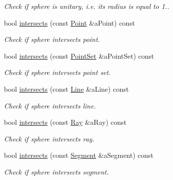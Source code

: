 \begin{DoxyCompactItemize}
\begin{DoxyCompactList}\small\item\em Check if sphere is unitary, i.\+e. its radius is equal to 1.. \end{DoxyCompactList}\item 
bool \hyperlink{classlibrary_1_1math_1_1geom_1_1d3_1_1objects_1_1_sphere_a4fba612ae266e54b1ce301831aef5219}{intersects} (const \hyperlink{classlibrary_1_1math_1_1geom_1_1d3_1_1objects_1_1_point}{Point} \&a\+Point) const
\begin{DoxyCompactList}\small\item\em Check if sphere intersects point. \end{DoxyCompactList}\item 
bool \hyperlink{classlibrary_1_1math_1_1geom_1_1d3_1_1objects_1_1_sphere_a3b92bc83fc458553437b7e2a50849859}{intersects} (const \hyperlink{classlibrary_1_1math_1_1geom_1_1d3_1_1objects_1_1_point_set}{Point\+Set} \&a\+Point\+Set) const
\begin{DoxyCompactList}\small\item\em Check if sphere intersects point set. \end{DoxyCompactList}\item 
bool \hyperlink{classlibrary_1_1math_1_1geom_1_1d3_1_1objects_1_1_sphere_a3740a954ea02ce23ff121a92f8902d92}{intersects} (const \hyperlink{classlibrary_1_1math_1_1geom_1_1d3_1_1objects_1_1_line}{Line} \&a\+Line) const
\begin{DoxyCompactList}\small\item\em Check if sphere intersects line. \end{DoxyCompactList}\item 
bool \hyperlink{classlibrary_1_1math_1_1geom_1_1d3_1_1objects_1_1_sphere_a726c504380238289eb3a2faf80f3d472}{intersects} (const \hyperlink{classlibrary_1_1math_1_1geom_1_1d3_1_1objects_1_1_ray}{Ray} \&a\+Ray) const
\begin{DoxyCompactList}\small\item\em Check if sphere intersects ray. \end{DoxyCompactList}\item 
bool \hyperlink{classlibrary_1_1math_1_1geom_1_1d3_1_1objects_1_1_sphere_af2ec8951ba63bd6718588e491213fddf}{intersects} (const \hyperlink{classlibrary_1_1math_1_1geom_1_1d3_1_1objects_1_1_segment}{Segment} \&a\+Segment) const
\begin{DoxyCompactList}\small\item\em Check if sphere intersects segment. \end{DoxyCompactList}\item 

\end{DoxyCompactItemize}
